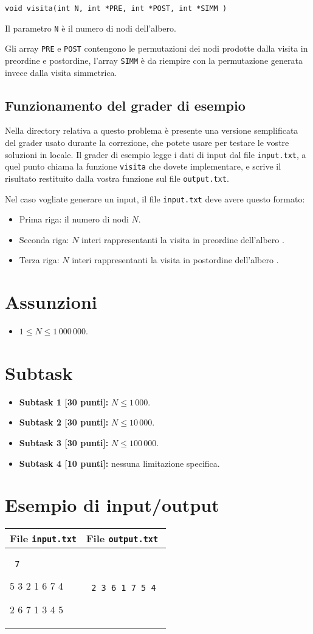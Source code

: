 \documentclass[a4paper,11pt]{article}
\newcommand{\file}[1]{\texttt{#1}}
\newcommand{\esempio}[2]{
\noindent\begin{minipage}{\textwidth}
\begin{tabular}{|p{11cm}|p{5cm}|}
	\hline
	\textbf{File \file{input.txt}} & \textbf{File \file{output.txt}}\\
	\hline
	\tt \small #1 &
	\tt \small #2 \\
	\hline
\end{tabular}
\end{minipage}
}
\begin{document}
\begin{verbatim}
void visita(int N, int *PRE, int *POST, int *SIMM )
\end{verbatim}

Il parametro \texttt{N} è il numero di nodi dell'albero.

Gli array \texttt{PRE} e \texttt{POST} contengono le permutazioni dei nodi prodotte dalla visita in preordine e postordine,
l'array \texttt{SIMM} \`e da riempire con la permutazione generata invece dalla visita simmetrica.

\subsection*{Funzionamento del grader di esempio}
Nella directory relativa a questo problema è presente una versione
semplificata del grader usato durante la correzione, che potete usare
per testare le vostre soluzioni in locale. Il grader di esempio legge
i dati di input dal file \file{input.txt}, a quel punto chiama la
funzione \texttt{visita} che dovete implementare, e scrive il risultato
restituito dalla vostra funzione sul file \file{output.txt}.

Nel caso vogliate generare un input, il file \file{input.txt} deve
avere questo formato:
\begin{itemize}[noitemsep]
\item Prima riga: il numero di nodi $N$.
\item Seconda riga: $N$ interi rappresentanti la visita in preordine dell'albero .
\item Terza riga: $N$ interi rappresentanti la visita in postordine dell'albero .
\end{itemize}


\section*{Assunzioni}
\begin{itemize}[nolistsep, noitemsep]
\item $1 \le N \le 1\,000\,000 $.
\end{itemize}

\section*{Subtask}
\begin{itemize}
\item \textbf{Subtask 1 [30 punti]:} $N \le 1\,000$.
\item \textbf{Subtask 2 [30 punti]:} $N \le 10\,000$.
\item \textbf{Subtask 3 [30 punti]:} $N \le 100\,000$.
\item \textbf{Subtask 4 [10 punti]:} nessuna limitazione specifica.
\end{itemize}


\section*{Esempio di input/output}
\esempio{
7

5 3 2 1 6 7 4

2 6 7 1 3 4 5

}{
2 3 6 1 7 5 4
}
\end{document}
